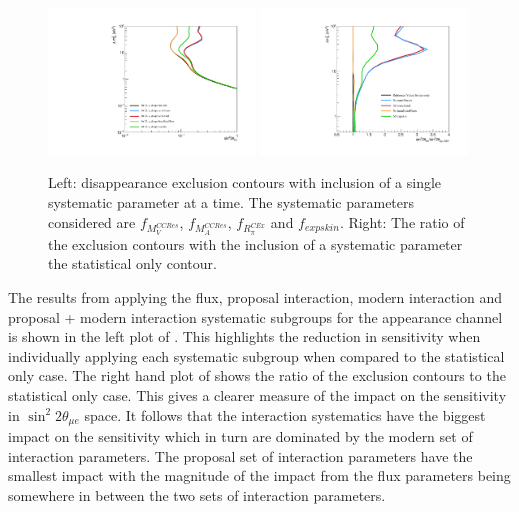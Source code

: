 \begin{figure}[h!]
    \centering
    \includegraphics[width = 0.49\textwidth]{figures-chap6/exclusion_contours/single_param/nue_disapp_single_param.pdf}
    \includegraphics[width =0.49\textwidth]{figures-chap6/exclusion_contours/single_param/nue_disapp_single_param_ratio.pdf}
    \caption[\nue disappearance exclusion contours with inclusion of a single systematic parameter at a time.]{Left: \nue disappearance exclusion contours with inclusion of a single systematic parameter at a time. The systematic parameters considered are $f_{M_V^{CCRes}}$, $f_{M_A^{CCRes}}$, $f_{R_{\pi}^{C Ex}}$ and $f_{expskin}$. Right: The ratio of the exclusion contours with the inclusion of a systematic parameter the statistical only contour.}
    \label{fig::nue_disapp_single_param}
\end{figure}

\clearpage

The results from applying the flux, proposal interaction, modern interaction and proposal + modern interaction systematic subgroups for the \nue appearance channel is shown in the left plot of  . This highlights the reduction in sensitivity when individually applying each systematic subgroup when compared to the statistical only case. The right hand plot of  shows the ratio of the exclusion contours to the statistical only case. This gives a clearer measure of the impact on the sensitivity in $\sin^2{2\theta_{\mu e}}$ space. It follows that the interaction systematics have the biggest impact on the sensitivity which in turn are dominated by the modern set of interaction parameters. The proposal set of interaction parameters have the smallest impact with the magnitude of the impact from the flux parameters being somewhere in between the two sets of interaction parameters. 

